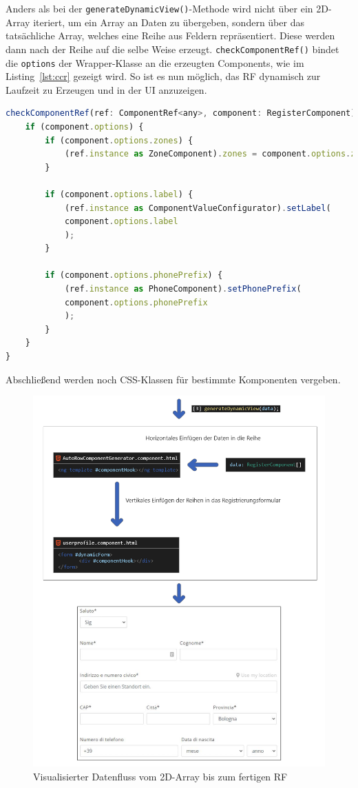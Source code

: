 Anders als bei der \texttt{generateDynamicView()}-Methode wird nicht über ein 2D-Array iteriert, um ein Array an Daten zu übergeben, sondern über das tatsächliche Array, welches eine Reihe aus Feldern repräsentiert. Diese werden dann nach der Reihe auf die selbe Weise erzeugt. \texttt{checkComponentRef()} bindet die \texttt{options} der Wrapper-Klasse an die erzeugten Components, wie im Listing~\ref{lst:ccr} gezeigt wird. So ist es nun möglich, das RF dynamisch zur Laufzeit zu Erzeugen und in der UI anzuzeigen.

\begin{lstlisting}[caption={Die \texttt{checkComponentRef()}-Methode der \texttt{AutoRowComponentGenerator}-Klasse}, language=JavaScript,label={lst:ccr}]
checkComponentRef(ref: ComponentRef<any>, component: RegisterComponent) {
	if (component.options) {
		if (component.options.zones) {
			(ref.instance as ZoneComponent).zones = component.options.zones;
		}
		
		if (component.options.label) {
			(ref.instance as ComponentValueConfigurator).setLabel(
			component.options.label
			);
		}
		
		if (component.options.phonePrefix) {
			(ref.instance as PhoneComponent).setPhonePrefix(
			component.options.phonePrefix
			);
		}
	}
}
\end{lstlisting}

Abschließend werden noch CSS-Klassen für bestimmte Komponenten vergeben.

\begin{figure}[H]
	\centerline{
		\includegraphics[width=1\textwidth, frame]{./grafiken/RF_Visualisierter Ablauf_2.png}
	}
	\vskip0pt
	\caption{Visualisierter Datenfluss vom 2D-Array bis zum fertigen RF}
\end{figure}

